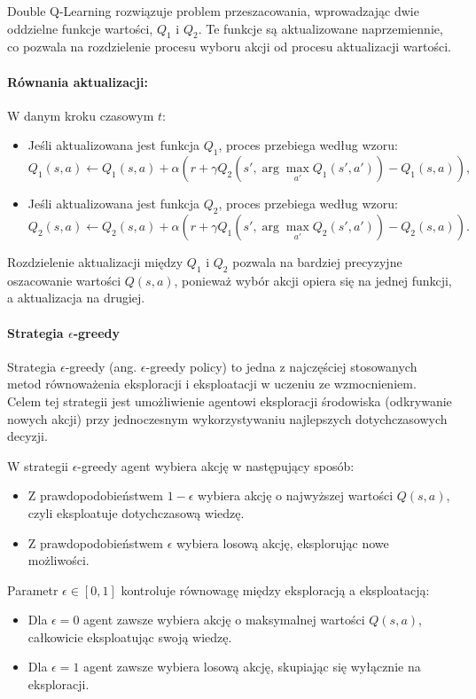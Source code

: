 Double Q-Learning rozwiązuje problem przeszacowania, wprowadzając dwie oddzielne funkcje wartości, \(Q_1\) i \(Q_2\). Te funkcje są aktualizowane naprzemiennie, co pozwala na rozdzielenie procesu wyboru akcji od procesu aktualizacji wartości.

\paragraph{Równania aktualizacji:}
W danym kroku czasowym \(t\):
\begin{itemize}
	\item Jeśli aktualizowana jest funkcja \(Q_1\), proces przebiega według wzoru:
	      \[
		      Q_1(s, a) \leftarrow Q_1(s, a) + \alpha \left( r + \gamma Q_2(s', \arg\max_{a'} Q_1(s', a')) - Q_1(s, a) \right),
	      \]
	\item Jeśli aktualizowana jest funkcja \(Q_2\), proces przebiega według wzoru:
	      \[
		      Q_2(s, a) \leftarrow Q_2(s, a) + \alpha \left( r + \gamma Q_1(s', \arg\max_{a'} Q_2(s', a')) - Q_2(s, a) \right).
	      \]
\end{itemize}

Rozdzielenie aktualizacji między \(Q_1\) i \(Q_2\) pozwala na bardziej precyzyjne oszacowanie wartości \(Q(s, a)\), ponieważ wybór akcji opiera się na jednej funkcji, a aktualizacja na drugiej.

\paragraph{Strategia \(\epsilon\)-greedy}

Strategia \(\epsilon\)-greedy (ang. \(\epsilon\)-greedy policy) to jedna z najczęściej stosowanych metod równoważenia eksploracji i eksploatacji w uczeniu ze wzmocnieniem. Celem tej strategii jest umożliwienie agentowi eksploracji środowiska (odkrywanie nowych akcji) przy jednoczesnym wykorzystywaniu najlepszych dotychczasowych decyzji.

W strategii \(\epsilon\)-greedy agent wybiera akcję w następujący sposób:
\begin{itemize}
	\item Z prawdopodobieństwem \(1 - \epsilon\) wybiera akcję o najwyższej wartości \(Q(s, a)\), czyli eksploatuje dotychczasową wiedzę.
	\item Z prawdopodobieństwem \(\epsilon\) wybiera losową akcję, eksplorując nowe możliwości.
\end{itemize}

Parametr \(\epsilon \in [0, 1]\) kontroluje równowagę między eksploracją a eksploatacją:
\begin{itemize}
	\item Dla \(\epsilon = 0\) agent zawsze wybiera akcję o maksymalnej wartości \(Q(s, a)\), całkowicie eksploatując swoją wiedzę.
	\item Dla \(\epsilon = 1\) agent zawsze wybiera losową akcję, skupiając się wyłącznie na eksploracji.
\end{itemize}

